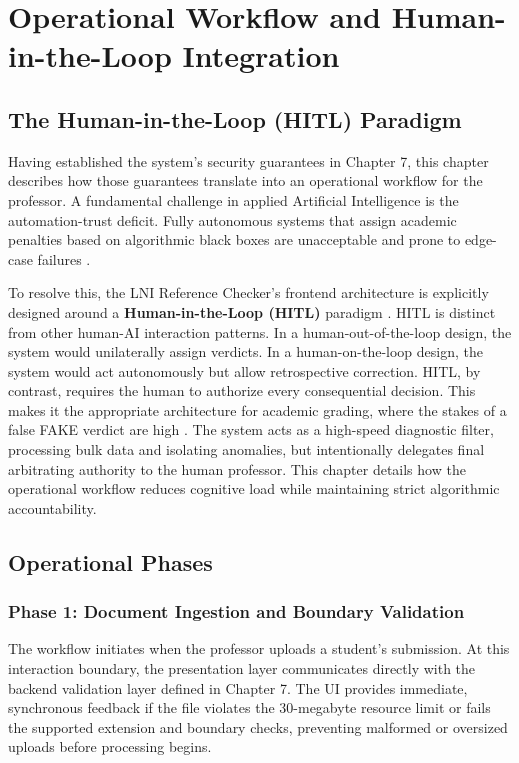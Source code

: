 \documentclass[12pt,a4paper,oneside]{report}
\begin{document}
\chapter{Operational Workflow and Human-in-the-Loop Integration}

\section{The Human-in-the-Loop (HITL) Paradigm}
 
Having established the system's security guarantees in Chapter 7, this chapter describes how those guarantees translate into an operational workflow for the professor. A fundamental challenge in applied Artificial Intelligence is the automation-trust deficit. Fully autonomous systems that assign academic penalties based on algorithmic black boxes are unacceptable and prone to edge-case failures \cite{shneiderman2020}. 

To resolve this, the LNI Reference Checker's frontend architecture is explicitly designed around a \textbf{Human-in-the-Loop (HITL)} paradigm \cite{shneiderman2020}. HITL is distinct from other human-AI interaction patterns. In a human-out-of-the-loop design, the system would unilaterally assign verdicts. In a human-on-the-loop design, the system would act autonomously but allow retrospective correction. HITL, by contrast, requires the human to authorize every consequential decision. This makes it the appropriate architecture for academic grading, where the stakes of a false FAKE verdict are high \cite{shneiderman2020}. The system acts as a high-speed diagnostic filter, processing bulk data and isolating anomalies, but intentionally delegates final arbitrating authority to the human professor. This chapter details how the operational workflow reduces cognitive load while maintaining strict algorithmic accountability.


 
\section{Operational Phases}
 
\subsection{Phase 1: Document Ingestion and Boundary Validation}
The workflow initiates when the professor uploads a student's submission. At this interaction boundary, the presentation layer communicates directly with the backend validation layer defined in Chapter 7. The UI provides immediate, synchronous feedback if the file violates the 30-megabyte resource limit or fails the supported extension and boundary checks, preventing malformed or oversized uploads before processing begins.
\end{document}
